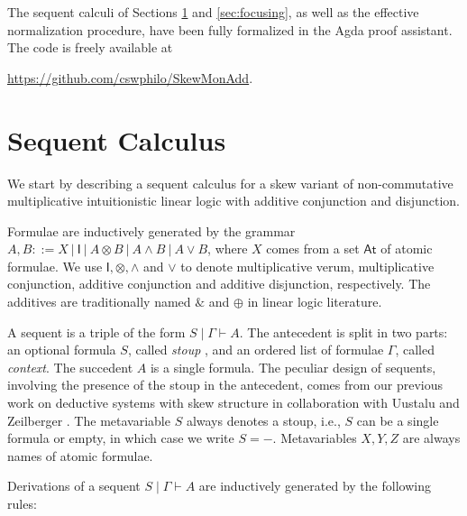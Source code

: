 \documentclass[submission,copyright,creativecommons]{eptcs}
\theoremstyle{definition}
\newcommand{\ot}{\otimes}
\newcommand{\I}{\mathsf{I}}
\begin{document}
The sequent calculi of Sections \ref{sec:sequent-calculus} and \ref{sec:focusing}, as well as the effective normalization procedure, have been fully formalized in the Agda proof assistant. The code is freely available at
\begin{center}
  \url{https://github.com/cswphilo/SkewMonAdd}.
\end{center}

\section{Sequent Calculus}\label{sec:sequent-calculus}
We start by describing a sequent calculus for a skew variant of non-commutative multiplicative intuitionistic linear logic with additive conjunction and disjunction.

Formulae are inductively generated by the grammar $A,B ::= X \ | \ \I \ | \ A \ot B \ | \ A \land B \ | \ A \lor B$, where $X$ comes from a set $\mathsf{At}$ of atomic formulae. 
We use $\I , \ot , \land$ and $\lor$ to denote multiplicative verum, multiplicative conjunction, additive conjunction and additive disjunction, respectively. The additives are traditionally named $\&$ and $\oplus$ in linear logic literature.

A sequent is a triple of the form $S \mid \Gamma \vdash A$.
The antecedent is split in two parts: an optional formula $S$, called \emph{stoup} \cite{girard:constructive:91}, and an ordered list of formulae $\Gamma$, called \emph{context}.
The succedent $A$ is a single formula.
The peculiar design of sequents, involving the presence of the stoup in the antecedent, comes from our previous work on deductive systems with skew structure in collaboration with Uustalu and Zeilberger \cite{uustalu:sequent:2021,uustalu:proof:nodate,uustalu:deductive:nodate,veltri:coherence:2021,UVW:protsn}.
The metavariable $S$ always denotes a stoup, i.e., $S$ can be a single formula or empty, in which case we write $S = {-}$. Metavariables $X,Y,Z$ are always names of atomic formulae.

Derivations of a sequent $S \mid \Gamma \vdash A$ are inductively generated by the following rules:
\end{document}
